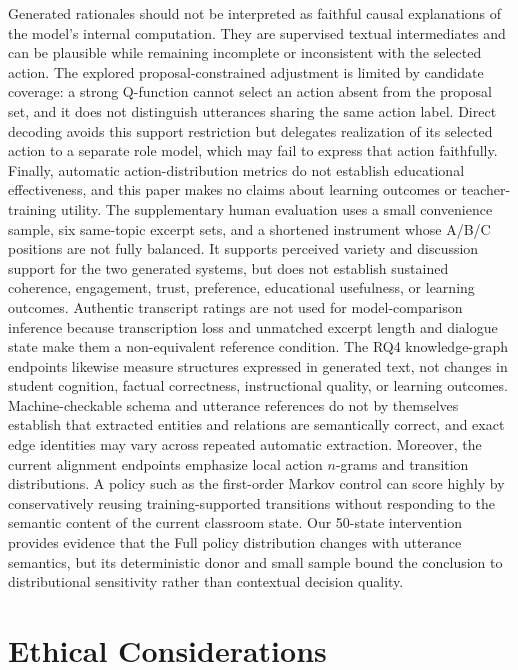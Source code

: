 \documentclass[manuscript,review,anonymous]{acmart}
\begin{document}
Generated rationales should not be interpreted as faithful causal explanations of the model's internal computation.
They are supervised textual intermediates and can be plausible while remaining incomplete or inconsistent with the selected action.
The explored proposal-constrained adjustment is limited by candidate coverage: a strong Q-function cannot select an action absent from the proposal set, and it does not distinguish utterances sharing the same action label. Direct decoding avoids this support restriction but delegates realization of its selected action to a separate role model, which may fail to express that action faithfully.
Finally, automatic action-distribution metrics do not establish educational
effectiveness, and this paper makes no claims about learning outcomes or
teacher-training utility.
The supplementary human evaluation uses a small convenience sample, six
same-topic excerpt sets, and a shortened instrument whose A/B/C positions are
not fully balanced. It supports perceived variety and discussion support for
the two generated systems, but does not establish sustained coherence,
engagement, trust, preference, educational usefulness, or learning outcomes.
Authentic transcript ratings are not used for model-comparison inference
because transcription loss and unmatched excerpt length and dialogue state
make them a non-equivalent reference condition.
The RQ4 knowledge-graph endpoints likewise measure structures expressed in
generated text, not changes in student cognition, factual correctness,
instructional quality, or learning outcomes. Machine-checkable schema and
utterance references do not by themselves establish that extracted entities
and relations are semantically correct, and exact edge identities may vary
across repeated automatic extraction.
Moreover, the current alignment endpoints emphasize local action $n$-grams and
transition distributions. A policy such as the first-order Markov control can
score highly by conservatively reusing training-supported transitions without
responding to the semantic content of the current classroom state. Our
50-state intervention provides evidence that the Full policy distribution
changes with utterance semantics, but its deterministic donor and small sample
bound the conclusion to distributional sensitivity rather than contextual
decision quality.

\section*{Ethical Considerations}
\end{document}
